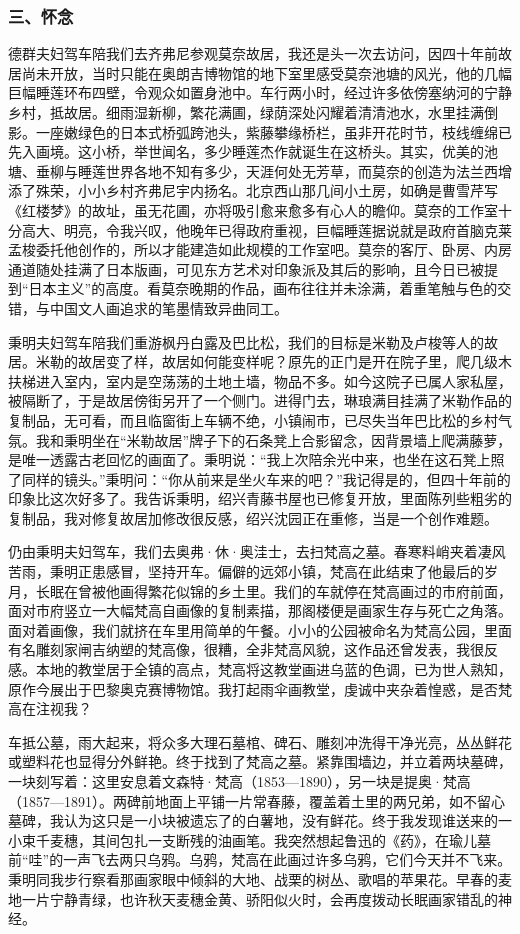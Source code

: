 \documentclass{article}
\begin{document}
\subsubsection{三、怀念}
德群夫妇驾车陪我们去齐弗尼参观莫奈故居，我还是头一次去访问，因四十年前故居尚未开放，当时只能在奥朗吉博物馆的地下室里感受莫奈池塘的风光，他的几幅巨幅睡莲环布四壁，令观众如置身池中。车行两小时，经过许多依傍塞纳河的宁静乡村，抵故居。细雨湿新柳，繁花满圃，绿荫深处闪耀着清清池水，水里挂满倒影。一座嫩绿色的日本式桥弧跨池头，紫藤攀缘桥栏，虽非开花时节，枝线缠绵已先入画境。这小桥，举世闻名，多少睡莲杰作就诞生在这桥头。其实，优美的池塘、垂柳与睡莲世界各地不知有多少，天涯何处无芳草，而莫奈的创造为法兰西增添了殊荣，小小乡村齐弗尼宇内扬名。北京西山那几间小土房，如确是曹雪芹写《红楼梦》的故址，虽无花圃，亦将吸引愈来愈多有心人的瞻仰。莫奈的工作室十分高大、明亮，令我兴叹，他晚年已得政府重视，巨幅睡莲据说就是政府首脑克莱孟梭委托他创作的，所以才能建造如此规模的工作室吧。莫奈的客厅、卧房、内房通道随处挂满了日本版画，可见东方艺术对印象派及其后的影响，且今日已被提到“日本主义”的高度。看莫奈晚期的作品，画布往往并未涂满，着重笔触与色的交错，与中国文人画追求的笔墨情致异曲同工。

秉明夫妇驾车陪我们重游枫丹白露及巴比松，我们的目标是米勒及卢梭等人的故居。米勒的故居变了样，故居如何能变样呢？原先的正门是开在院子里，爬几级木扶梯进入室内，室内是空荡荡的土地土墙，物品不多。如今这院子已属人家私屋，被隔断了，于是故居傍街另开了一个侧门。进得门去，琳琅满目挂满了米勒作品的复制品，无可看，而且临窗街上车辆不绝，小镇闹市，已尽失当年巴比松的乡村气氛。我和秉明坐在“米勒故居”牌子下的石条凳上合影留念，因背景墙上爬满藤萝，是唯一透露古老回忆的画面了。秉明说：“我上次陪余光中来，也坐在这石凳上照了同样的镜头。”秉明问：“你从前来是坐火车来的吧？”我记得是的，但四十年前的印象比这次好多了。我告诉秉明，绍兴青藤书屋也已修复开放，里面陈列些粗劣的复制品，我对修复故居加修改很反感，绍兴沈园正在重修，当是一个创作难题。

仍由秉明夫妇驾车，我们去奥弗·休·奥洼士，去扫梵高之墓。春寒料峭夹着凄风苦雨，秉明正患感冒，坚持开车。偏僻的远郊小镇，梵高在此结束了他最后的岁月，长眠在曾被他画得繁花似锦的乡土里。我们的车就停在梵高画过的市府前面，面对市府竖立一大幅梵高自画像的复制素描，那阁楼便是画家生存与死亡之角落。面对着画像，我们就挤在车里用简单的午餐。小小的公园被命名为梵高公园，里面有名雕刻家闸吉纳塑的梵高像，很糟，全非梵高风貌，这作品还曾发表，我很反感。本地的教堂居于全镇的高点，梵高将这教堂画进乌蓝的色调，已为世人熟知，原作今展出于巴黎奥克赛博物馆。我打起雨伞画教堂，虔诚中夹杂着惶惑，是否梵高在注视我？

车抵公墓，雨大起来，将众多大理石墓棺、碑石、雕刻冲洗得干净光亮，丛丛鲜花或塑料花也显得分外鲜艳。终于找到了梵高之墓。紧靠围墙边，并立着两块墓碑，一块刻写着：这里安息着文森特·梵高（1853—1890），另一块是提奥·梵高（1857—1891）。两碑前地面上平铺一片常春藤，覆盖着土里的两兄弟，如不留心墓碑，我认为这只是一小块被遗忘了的白薯地，没有鲜花。终于我发现谁送来的一小束千麦穗，其间包扎一支断残的油画笔。我突然想起鲁迅的《药》，在瑜儿墓前“哇”的一声飞去两只乌鸦。乌鸦，梵高在此画过许多乌鸦，它们今天并不飞来。秉明同我步行察看那画家眼中倾斜的大地、战栗的树丛、歌唱的苹果花。早春的麦地一片宁静青绿，也许秋天麦穗金黄、骄阳似火时，会再度拨动长眠画家错乱的神经。
\end{document}
